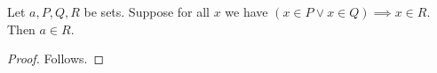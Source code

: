 \begin{proposition}\label{obvious_missing_boolean_premise}
    Let $a,P,Q,R$ be sets.
    Suppose for all $x$ we have $(x\in P\lor x\in Q)\implies x\in R$.
    Then $a\in R$.
\end{proposition}
\begin{proof}
    Follows.
\end{proof}
